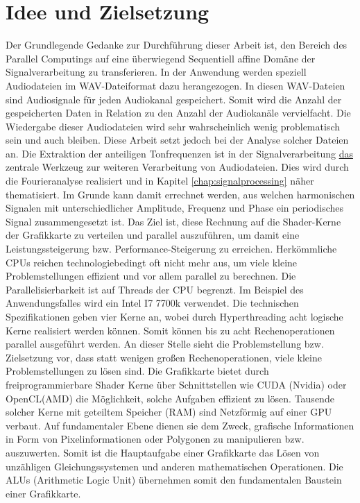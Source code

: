 
\section{Idee und Zielsetzung}

Der Grundlegende Gedanke zur Durchführung dieser Arbeit ist, den Bereich des Parallel Computings auf eine überwiegend Sequentiell affine Domäne der Signalverarbeitung zu transferieren. In der Anwendung werden speziell Audiodateien im WAV-Dateiformat dazu herangezogen. In diesen WAV-Dateien sind Audiosignale für jeden Audiokanal gespeichert. Somit wird die Anzahl der gespeicherten Daten in Relation zu den Anzahl der Audiokanäle vervielfacht. Die Wiedergabe dieser Audiodateien wird sehr wahrscheinlich wenig problematisch sein und auch bleiben. Diese Arbeit setzt jedoch bei der Analyse solcher Dateien an. Die Extraktion der anteiligen Tonfrequenzen ist in der Signalverarbeitung \underline{das} zentrale Werkzeug zur weiteren Verarbeitung von Audiodateien. Dies wird durch die Fourieranalyse realisiert und in Kapitel \ref{chap:signalprocessing} näher thematisiert. Im Grunde kann damit errechnet werden, aus welchen harmonischen Signalen mit unterschiedlicher Amplitude, Frequenz und Phase ein periodisches Signal zusammengesetzt ist. Das Ziel ist, diese Rechnung auf die Shader-Kerne der Grafikkarte zu verteilen und parallel auszuführen, um damit eine Leistungssteigerung bzw. Performance-Steigerung zu erreichen. Herkömmliche  CPUs reichen technologiebedingt oft nicht mehr aus, um viele kleine Problemstellungen effizient und vor allem parallel zu berechnen. Die Parallelisierbarkeit ist auf Threads der CPU begrenzt. Im Beispiel des Anwendungsfalles wird ein Intel I7 7700k verwendet. Die technischen Spezifikationen geben vier Kerne an, wobei durch Hyperthreading acht logische Kerne realisiert werden können. Somit können bis zu acht Rechenoperationen parallel ausgeführt werden. An dieser Stelle sieht die Problemstellung bzw. Zielsetzung vor, dass statt wenigen großen Rechenoperationen, viele kleine Problemstellungen zu lösen sind. Die Grafikkarte bietet durch freiprogrammierbare Shader Kerne über Schnittstellen wie CUDA (Nvidia) oder OpenCL(AMD) die Möglichkeit, solche Aufgaben effizient zu lösen. Tausende solcher Kerne mit geteiltem Speicher (RAM) sind Netzförmig auf einer GPU verbaut. Auf fundamentaler Ebene dienen sie dem Zweck, grafische Informationen in Form von Pixelinformationen oder Polygonen zu manipulieren bzw. auszuwerten. Somit ist die Hauptaufgabe einer Grafikkarte das Lösen von unzähligen Gleichungssystemen und anderen mathematischen Operationen. Die ALUs (Arithmetic Logic Unit) übernehmen somit den fundamentalen Baustein einer Grafikkarte. 

